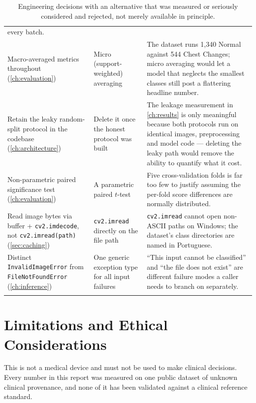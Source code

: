 \documentclass[11pt,a4paper,oneside]{report}
\newcommand{\code}[1]{\texttt{\small #1}}
\begin{document}
\begin{longtable}{@{}p{3.1cm}p{4.6cm}p{6.5cm}@{}}
  every batch. \\
Macro-averaged metrics throughout (\cref{ch:evaluation}) &
  Micro (support-weighted) averaging &
  The dataset runs 1{,}340 Normal against 544 Chest Changes; micro averaging
  would let a model that neglects the smallest classes still post a
  flattering headline number. \\
Retain the leaky random-split protocol in the codebase
  (\cref{ch:architecture}) &
  Delete it once the honest protocol was built &
  The leakage measurement in \cref{ch:results} is only meaningful because
  both protocols run on identical images, preprocessing and model code ---
  deleting the leaky path would remove the ability to quantify what it cost. \\
Non-parametric paired significance test (\cref{ch:evaluation}) &
  A parametric paired $t$-test &
  Five cross-validation folds is far too few to justify assuming the
  per-fold score differences are normally distributed. \\
Read image bytes via buffer + \code{cv2.imdecode}, not
  \code{cv2.imread(path)} (\cref{sec:caching}) &
  \code{cv2.imread} directly on the file path &
  \code{cv2.imread} cannot open non-ASCII paths on Windows; the dataset's
  class directories are named in Portuguese. \\
Distinct \code{InvalidImageError} from \code{FileNotFoundError}
  (\cref{ch:inference}) &
  One generic exception type for all input failures &
  ``This input cannot be classified'' and ``the file does not exist'' are
  different failure modes a caller needs to branch on separately. \\
\bottomrule
\caption{Engineering decisions with an alternative that was measured or
seriously considered and rejected, not merely available in principle.}
\label{tab:decision-ledger}
\end{longtable}

\chapter{Limitations and Ethical Considerations}
\label{ch:limitations}

\begin{warningbox}
This is not a medical device and must not be used to make clinical
decisions. Every number in this report was measured on one public dataset of
unknown clinical provenance, and none of it has been validated against a
clinical reference standard.
\end{warningbox}
\end{document}
